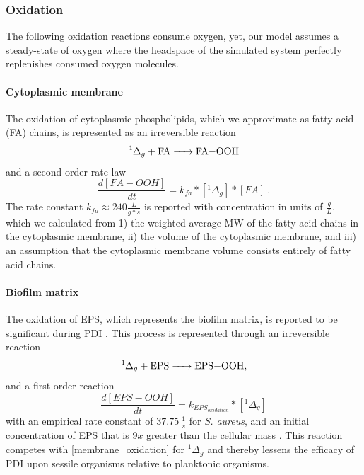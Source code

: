 \subsubsection{Oxidation}
The following oxidation reactions consume oxygen, yet, our model assumes a steady-state of oxygen where the headspace of the simulated system perfectly replenishes consumed oxygen molecules.

\paragraph{Cytoplasmic membrane} 
The oxidation of cytoplasmic phospholipids, which we approximate as fatty acid (FA) chains, is represented as an irreversible reaction \cite{Watabe2007OxidationMembranes.}
\begin{equation} \label{membrane_oxidation}
    \ce{^1\Delta_g + FA -> FA-OOH}
\end{equation}
and a second-order rate law
\begin{equation} \label{membrane_oxidation_kinetics}
    \frac{d[FA-OOH]}{dt} = k_{fa}*[^1\Delta_g]*[FA]~.
\end{equation}
The rate constant $k_{fa} \approx 240 \frac{L}{g*s}$ \cite{Mukai2019KineticSolution} is reported with concentration in units of $\frac{g}{L}$, which we calculated from 1) the weighted average MW of the fatty acid chains in the cytoplasmic membrane, ii) the volume of the cytoplasmic membrane, and iii) an assumption that the cytoplasmic membrane volume consists entirely of fatty acid chains. 

\paragraph{Biofilm matrix} 
The oxidation of EPS, which represents the biofilm matrix, is reported to be significant during PDI \cite{Beirao2014PhotodynamicPorphyrin}. This process is represented through an irreversible reaction
\begin{equation} \label{EPS_oxidation}
    \ce{^1\Delta_g + EPS -> EPS-OOH},
\end{equation}
and a first-order reaction
\begin{equation} \label{EPS_oxidation_kinetics}
    \frac{d[EPS-OOH]}{dt} = k_{EPS_{oxidation}}*[^1\Delta_g]
\end{equation}
with an empirical rate constant of $37.75~\frac{1}{s}$ for \textit{S. aureus}, and an initial concentration of EPS that is $9x$ greater than the cellular mass \cite{Flemming2010TheMatrix}.
This reaction competes with \cref{membrane_oxidation} for $^1\Delta_g$ and thereby lessens the efficacy of PDI upon sessile organisms relative to planktonic organisms. 

